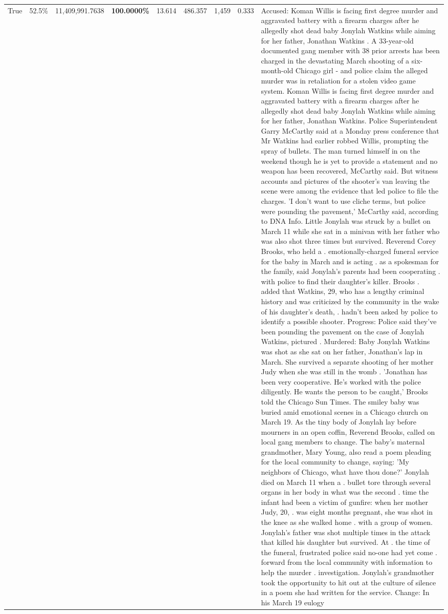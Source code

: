 \begin{table}[H]
\begin{tabular}{lllrlllll}
True & 52.5\% & 11,409,991.7638 & \bfseries \color{red} 100.0000\% & 13.614 & 486.357 & 1,459 & 0.333 & Accused: Koman Willis is facing first degree murder and aggravated battery with a firearm charges after he allegedly shot dead baby Jonylah Watkins while aiming for her father, Jonathan Watkins . A 33-year-old documented gang member with 38 prior arrests has been charged in the devastating March shooting of a six-month-old Chicago girl - and police claim the alleged murder was in retaliation for a stolen video game system. Koman Willis is facing first degree murder and aggravated battery with a firearm charges after he allegedly shot dead baby Jonylah Watkins while aiming for her father, Jonathan Watkins. Police Superintendent Garry McCarthy said at a Monday press conference that Mr Watkins had earlier robbed Willis, prompting the spray of bullets. The man turned himself in on the weekend though he is yet to provide a statement and no weapon has been recovered, McCarthy said. But witness accounts and pictures of the shooter's van leaving the scene were among the evidence that led police to file the charges. 'I don't want to use cliche terms, but police were pounding the pavement,' McCarthy said, according to DNA Info. Little Jonylah was struck by a bullet on March 11 while she sat in a minivan with her father who was also shot three times but survived. Reverend Corey Brooks, who held a . emotionally-charged funeral service for the baby in March and is acting . as a spokesman for the family, said Jonylah's parents had been cooperating . with police to find their daughter's killer. Brooks . added that Watkins, 29, who has a lengthy criminal history and was criticized by the community in the wake of his daughter's death, . hadn't been asked by police to identify a possible shooter. Progress: Police said they've been pounding the pavement on the case of Jonylah Watkins, pictured . Murdered: Baby Jonylah Watkins was shot as she sat on her father, Jonathan's lap in March. She survived a separate shooting of her mother Judy when she was still in the womb . 'Jonathan has been very cooperative. He's worked with the police diligently. He wants the person to be caught,' Brooks told the Chicago Sun Times. The smiley baby was buried amid emotional scenes in a Chicago church on March 19. As the tiny body of Jonylah lay before mourners in an open coffin, Reverend Brooks, called on local gang members to change. The baby's maternal grandmother, Mary Young, also read a poem pleading for the local community to change, saying: 'My neighbors of Chicago, what have thou done?' Jonylah died on March 11 when a . bullet tore through several organs in her body in what was the second . time the infant had been a victim of gunfire: when her mother Judy, 20, . was eight months pregnant, she was shot in the knee as she walked home . with a group of women. Jonylah's father was shot multiple times in the attack that killed his daughter but survived. At . the time of the funeral, frustrated police said no-one had yet come . forward from the local community with information to help the murder . investigation. Jonylah's grandmother took the opportunity to hit out at the culture of silence in a poem she had written for the service. Change: In his March 19 eulogy 
\end{tabular}
\end{table}
